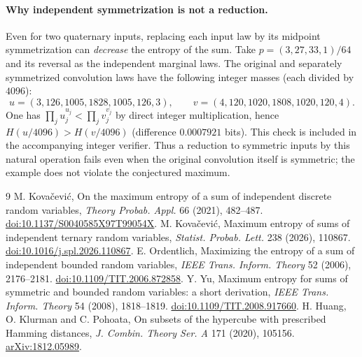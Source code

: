 \documentclass[11pt]{article}
\begin{document}
\paragraph{Why independent symmetrization is not a reduction.}
Even for two quaternary inputs, replacing each input law by its midpoint
symmetrization can \emph{decrease} the entropy of the sum. Take
$p=(3,27,33,1)/64$ and its reversal as the independent marginal laws.
The original and separately symmetrized convolution laws have the
following integer masses (each divided by $4096$):
\[
 u=(3,126,1005,1828,1005,126,3),\qquad
 v=(4,120,1020,1808,1020,120,4).
\]
One has $\prod_j u_j^{u_j}<\prod_j v_j^{v_j}$ by direct integer
multiplication, hence $H(u/4096)>H(v/4096)$ (difference $0.0007921$
bits). This check is included in the accompanying integer verifier.
Thus a reduction to symmetric inputs by this natural operation fails
even when the original convolution itself is symmetric; the example
does not violate the conjectured maximum.

\begin{thebibliography}{9}
 M. Kova\v{c}evi\'c, On the maximum entropy of a sum of independent
discrete random variables, \emph{Theory Probab. Appl.} 66 (2021), 482--487.
\href{https://doi.org/10.1137/S0040585X97T99054X}{doi:10.1137/S0040585X97T99054X}.
 M. Kova\v{c}evi\'c, Maximum entropy of sums of independent ternary
random variables, \emph{Statist. Probab. Lett.} 238 (2026), 110867.
\href{https://doi.org/10.1016/j.spl.2026.110867}{doi:10.1016/j.spl.2026.110867}.
 E. Ordentlich, Maximizing the entropy of a sum of independent bounded random
variables, \emph{IEEE Trans. Inform. Theory} 52 (2006), 2176--2181.
\href{https://doi.org/10.1109/TIT.2006.872858}{doi:10.1109/TIT.2006.872858}.
 Y. Yu, Maximum entropy for sums of symmetric and bounded random variables:
a short derivation, \emph{IEEE Trans. Inform. Theory} 54 (2008), 1818--1819.
\href{https://doi.org/10.1109/TIT.2008.917660}{doi:10.1109/TIT.2008.917660}.
 H. Huang, O. Klurman and C. Pohoata,
On subsets of the hypercube with prescribed Hamming distances,
\emph{J. Combin. Theory Ser. A} 171 (2020), 105156.
\href{https://arxiv.org/abs/1812.05989}{arXiv:1812.05989}.
\end{thebibliography}
\end{document}
